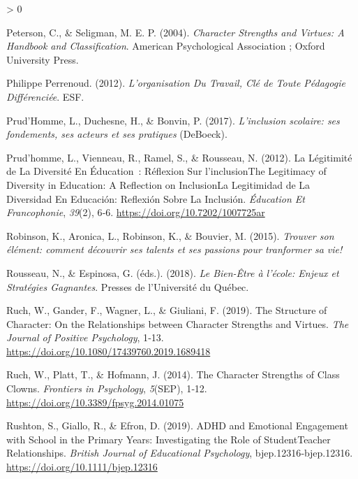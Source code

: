 \documentclass[
  french,
]{article}
\newlength{\cslhangindent}
\newenvironment{CSLReferences}[2] %
 {%
  \setlength{\parindent}{0pt}
  \ifodd #1 \everypar{\setlength{\hangindent}{\cslhangindent}}\ignorespaces\fi
  \ifnum #2 > 0
  \setlength{\parskip}{#2\baselineskip}
  \fi
 }%
 {}
\begin{document}
\begin{CSLReferences}{1}{0}
\leavevmode\hypertarget{ref-peterson2004}{}%
Peterson, C., \& Seligman, M. E. P. (2004). \emph{Character Strengths and Virtues: A Handbook and Classification}. {American Psychological Association ; Oxford University Press}.

\leavevmode\hypertarget{ref-philippeperrenoud2012}{}%
Philippe Perrenoud. (2012). \emph{L'organisation Du Travail, Clé de Toute Pédagogie Différenciée}. {ESF}.

\leavevmode\hypertarget{ref-prudhomme2017}{}%
Prud'Homme, L., Duchesne, H., \& Bonvin, P. (2017). \emph{{L'inclusion scolaire: ses fondements, ses acteurs et ses pratiques}} (DeBoeck).

\leavevmode\hypertarget{ref-prudhomme2012}{}%
Prud'homme, L., Vienneau, R., Ramel, S., \& Rousseau, N. (2012). La Légitimité de La Diversité En Éducation~: Réflexion Sur l'{inclusionThe Legitimacy} of {Diversity} in {Education}: {A Reflection} on {InclusionLa} Legitimidad de La Diversidad En Educación: Reflexión Sobre La Inclusión. \emph{Éducation Et Francophonie}, \emph{39}(2), 6‑6. \url{https://doi.org/10.7202/1007725ar}

\leavevmode\hypertarget{ref-robinson2015}{}%
Robinson, K., Aronica, L., Robinson, K., \& Bouvier, M. (2015). \emph{{Trouver son élément: comment découvrir ses talents et ses passions pour tranformer sa vie!}}

\leavevmode\hypertarget{ref-rousseau2018}{}%
Rousseau, N., \& Espinosa, G. (éds.). (2018). \emph{Le Bien-Être à l'école: Enjeux et Stratégies Gagnantes}. {Presses de l'Université du Québec}.

\leavevmode\hypertarget{ref-ruch2019a}{}%
Ruch, W., Gander, F., Wagner, L., \& Giuliani, F. (2019). The Structure of Character: {On} the Relationships between Character Strengths and Virtues. \emph{The Journal of Positive Psychology}, 1‑13. \url{https://doi.org/10.1080/17439760.2019.1689418}

\leavevmode\hypertarget{ref-ruch2014}{}%
Ruch, W., Platt, T., \& Hofmann, J. (2014). The Character Strengths of Class Clowns. \emph{Frontiers in Psychology}, \emph{5}(SEP), 1‑12. \url{https://doi.org/10.3389/fpsyg.2014.01075}

\leavevmode\hypertarget{ref-rushton2019}{}%
Rushton, S., Giallo, R., \& Efron, D. (2019). {ADHD} and Emotional Engagement with School in the Primary Years: {Investigating} the Role of Student{}Teacher Relationships. \emph{British Journal of Educational Psychology}, bjep.12316‑bjep.12316. \url{https://doi.org/10.1111/bjep.12316}


\end{CSLReferences}
\end{document}
